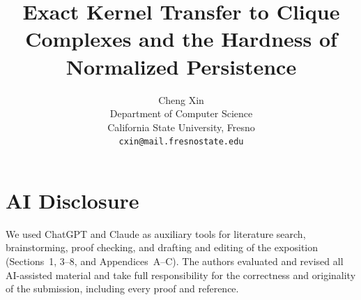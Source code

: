 \documentclass[11pt,a4paper]{article}
\title{Exact Kernel Transfer to Clique Complexes and the Hardness of
Normalized Persistence}
\author{Cheng Xin\\[0.4em]\small Department of Computer Science\\\small California State University, Fresno\\\small\texttt{cxin@mail.fresnostate.edu}}
\date{}
\begin{document}
\raggedbottom
\maketitle

\begin{abstract}

\end{abstract}













\clearpage
\appendix




\section*{AI Disclosure}
We used ChatGPT and Claude as auxiliary tools for literature search,
brainstorming, proof checking, and drafting and editing of the exposition
(Sections~1, 3--8, and Appendices~A--C).
The authors evaluated and revised all AI-assisted material and take full
responsibility for the correctness and originality of the submission,
including every proof and reference.
\end{document}
